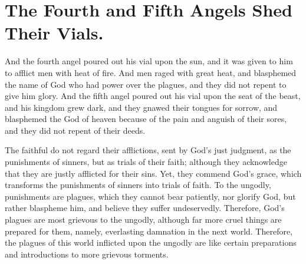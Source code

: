 \chapter[Sermon 70. The Fourth and Fifth Angels Shed Their Vials.]{The Fourth and Fifth Angels Shed Their Vials.}
\label{sermon:070}

And the fourth angel poured out his vial upon the sun, and it was given to him to afflict men with heat of fire. And men raged with great heat, and blasphemed the name of God who had power over the plagues, and they did not repent to give him glory. And the fifth angel poured out his vial upon the seat of the beast, and his kingdom grew dark, and they gnawed their tongues for sorrow, and blasphemed the God of heaven because of the pain and anguish of their sores, and they did not repent of their deeds.

The faithful do not regard their afflictions, sent by God’s just judgment, as the punishments of sinners, but as trials of their faith; although they acknowledge that they are justly afflicted for their sins. Yet, they commend God’s grace, which transforms the punishments of sinners into trials of faith. To the ungodly, punishments are plagues, which they cannot bear patiently, nor glorify God, but rather blaspheme him, and believe they suffer undeservedly. Therefore, God’s plagues are most grievous to the ungodly, although far more cruel things are prepared for them, namely, everlasting damnation in the next world. Therefore, the plagues of this world inflicted upon the ungodly are like certain preparations and introductions to more grievous torments.

